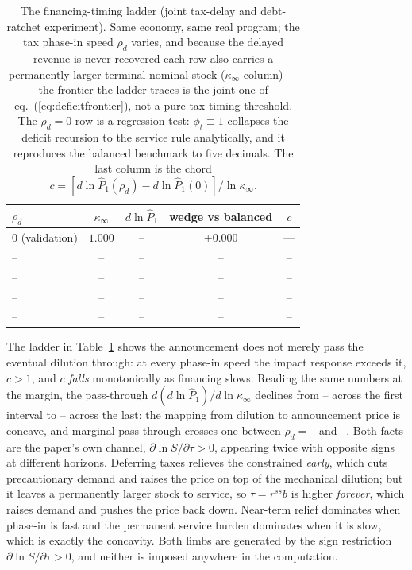 \documentclass[12pt]{article}
\providecommand{\pendingnum}{\textit{--}}
\providecommand{\DefBal}{\pendingnum}\providecommand{\DefImp}{\pendingnum}
\providecommand{\DefRhoA}{\pendingnum}\providecommand{\DefKapA}{\pendingnum}
\providecommand{\DefPA}{\pendingnum}\providecommand{\DefWA}{\pendingnum}
\providecommand{\DefCA}{\pendingnum}
\providecommand{\DefRhoB}{\pendingnum}\providecommand{\DefKapB}{\pendingnum}
\providecommand{\DefPB}{\pendingnum}\providecommand{\DefWB}{\pendingnum}
\providecommand{\DefCB}{\pendingnum}
\providecommand{\DefRhoC}{\pendingnum}\providecommand{\DefKapC}{\pendingnum}
\providecommand{\DefPC}{\pendingnum}\providecommand{\DefWC}{\pendingnum}
\providecommand{\DefCC}{\pendingnum}
\providecommand{\DefRhoD}{\pendingnum}\providecommand{\DefKapD}{\pendingnum}
\providecommand{\DefPD}{\pendingnum}\providecommand{\DefWD}{\pendingnum}
\providecommand{\DefCD}{\pendingnum}
\providecommand{\DefSlopeFirst}{\pendingnum}\providecommand{\DefSlopeLast}{\pendingnum}
\newcommand{\Sfun}{S}
\begin{document}
\begin{table}[htbp]\centering
\caption{The financing-timing ladder (joint tax-delay and debt-ratchet
experiment). Same economy, same real program; the tax phase-in speed
$\rho_d$ varies, and because the delayed revenue is never recovered each
row also carries a permanently larger terminal nominal stock
($\kappa_\infty$ column) --- the frontier the ladder traces is the joint
one of eq.~(\ref{eq:deficitfrontier}), not a pure tax-timing threshold.
The $\rho_d=0$ row is a
regression test: $\phi_t\equiv1$ collapses the deficit recursion to the
service rule analytically, and it reproduces the balanced benchmark to
five decimals. The last column is the chord
$c=[d\ln\hat P_1(\rho_d)-d\ln\hat P_1(0)]/\ln\kappa_\infty$.}
\label{tab:deficitladder}
\begin{tabular}{lcccc}
\hline\hline
$\rho_d$ & $\kappa_\infty$ & $d\ln \hat P_1$ & wedge vs balanced & $c$ \\
\hline
$0$ (validation) & $1.000$ & $\DefBal$ & $+0.000$ & --- \\
$\DefRhoA$ & $\DefKapA$ & $\DefPA$ & $\DefWA$ & $\DefCA$ \\
$\DefRhoB$ & $\DefKapB$ & $\DefPB$ & $\DefWB$ & $\DefCB$ \\
$\DefRhoC$ & $\DefKapC$ & $\DefPC$ & $\DefWC$ & $\DefCC$ \\
$\DefRhoD$ & $\DefKapD$ & $\DefPD$ & $\DefWD$ & $\DefCD$ \\
\hline\hline
\end{tabular}
\end{table}

The ladder in Table~\ref{tab:deficitladder} shows the announcement does not
merely pass the eventual dilution through: at every phase-in speed the
impact response exceeds it, $c>1$, and $c$ \emph{falls} monotonically as
financing slows. Reading the same numbers at the margin, the pass-through
$d(d\ln\hat P_1)/d\ln\kappa_\infty$ declines from $\DefSlopeFirst$ across
the first interval to $\DefSlopeLast$ across the last: the mapping from
dilution to announcement price is concave, and marginal pass-through
crosses one between $\rho_d=\DefRhoC$ and $\DefRhoD$. Both facts are the
paper's own channel, $\partial\ln\Sfun/\partial\tau>0$, appearing twice
with opposite signs at different horizons. Deferring taxes relieves the
constrained \emph{early}, which cuts precautionary demand and raises the
price on top of the mechanical dilution; but it leaves a permanently larger
stock to service, so $\tau=r^{ss}b$ is higher \emph{forever}, which raises
demand and pushes the price back down. Near-term relief dominates when
phase-in is fast and the permanent service burden dominates when it is
slow, which is exactly the concavity. Both limbs are generated by the sign restriction
$\partial\ln\Sfun/\partial\tau>0$, and neither is imposed anywhere in the
computation.
\end{document}
